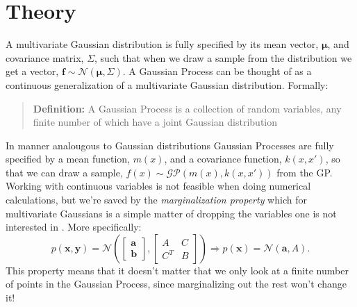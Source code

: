 \documentclass[a4paper,11pt,article,oneside]{memoir}
\begin{document}
\chapter{Theory}
\label{sec:theory}

A multivariate Gaussian distribution is fully specified by its mean vector, $\boldsymbol{\mu}$, and covariance matrix, $\Sigma$, such that when we draw a sample from the distribution we get a vector, $\mathbf{f} \sim \mathcal{N}\left( \boldsymbol{\mu}, \Sigma \right)$. A Gaussian Process can be thought of as a continuous generalization of a multivariate Gaussian distribution. Formally:
%
\begin{quote}
\textbf{Definition:} A Gaussian Process is a collection of random variables, any finite number of which have a joint Gaussian distribution \cite{rasmussen2006}
\end{quote}
%
In manner analougous to Gaussian distributions Gaussian Processes are fully specified by a mean function, $m(x)$, and a covariance function, $k(x,x')$, so that we can draw a sample, $f(x) \sim \mathcal{GP}\left( m(x), k(x,x') \right)$ from the GP. Working with continuous variables is not feasible when doing numerical calculations, but we're saved by the \emph{marginalization property} which for multivariate Gaussians is a simple matter of dropping the variables one is not interested in \cite{wiki:gauss}. More specifically:
%
\begin{equation}
p(\mathbf{x},\mathbf{y}) = \mathcal{N}\left( \begin{bmatrix} \mathbf{a} \\ \mathbf{b} \end{bmatrix} , \begin{bmatrix} A & C \\ C^T & B \end{bmatrix} \right) \Longrightarrow p(\mathbf{x}) = \mathcal{N}\left( \mathbf{a} , A \right). \nonumber
\end{equation}
%
This property means that it doesn't matter that we only look at a finite number of points in the Gaussian Process, since marginalizing out the rest won't change it!
\end{document}
